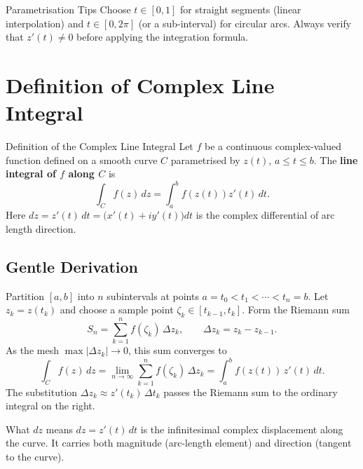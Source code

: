 \documentclass[12pt,a4paper]{article}
\begin{document}
\begin{learnbox}{Parametrisation Tips}
Choose $t \in [0,1]$ for straight segments (linear interpolation) and
$t \in [0, 2\pi]$ (or a sub-interval) for circular arcs. Always verify that
$z'(t) \ne 0$ before applying the integration formula.
\end{learnbox}

\section{Definition of Complex Line Integral}
\begin{infobox}{Definition of the Complex Line Integral}
Let $f$ be a continuous complex-valued function defined on a smooth curve $C$
parametrised by $z(t)$, $a \le t \le b$. The \textbf{line integral of $f$
along $C$} is
\[
  \int_C f(z)\,dz
  = \int_a^b f\!\left(z(t)\right) z'(t)\,dt.
\]
Here $dz = z'(t)\,dt = \bigl(x'(t) + iy'(t)\bigr)dt$ is the complex
differential of arc length direction.
\end{infobox}

\subsection*{Gentle Derivation}

Partition $[a,b]$ into $n$ subintervals at points
$a = t_0 < t_1 < \cdots < t_n = b$.
Let $z_k = z(t_k)$ and choose a sample point $\zeta_k \in [t_{k-1}, t_k]$.
Form the Riemann sum
\[
  S_n = \sum_{k=1}^{n} f(\zeta_k)\,\Delta z_k,
  \qquad \Delta z_k = z_k - z_{k-1}.
\]
As the mesh $\max|\Delta z_k| \to 0$, this sum converges to
\[
  \int_C f(z)\,dz
  = \lim_{n\to\infty} \sum_{k=1}^{n} f(\zeta_k)\,\Delta z_k
  = \int_a^b f(z(t))\,z'(t)\,dt.
\]
The substitution $\Delta z_k \approx z'(t_k)\,\Delta t_k$ passes the Riemann
sum to the ordinary integral on the right.

\begin{learnbox}{What $dz$ means}
$dz = z'(t)\,dt$ is the infinitesimal complex displacement along the curve.
It carries both magnitude (arc-length element) and direction (tangent to
the curve).
\end{learnbox}

\end{document}
